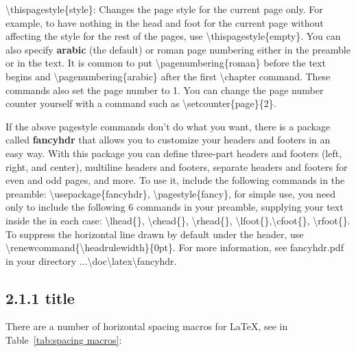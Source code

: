 \documentclass[12pt,openright]{book}
\begin{document}
\textbackslash thispagestyle\{style\}: Changes the page style for the current page only. For example, to have nothing in the head and foot for the current page without affecting the style for the rest of the pages, use \textbackslash thispagestyle\{empty\}. You can also specify \textbf{arabic} (the default) or roman page numbering either in the preamble or in the text. It is common to put \textbackslash pagenumbering\{roman\} before the text begins and \textbackslash pagenumbering\{arabic\} after the first \textbackslash chapter command. These commands also set the page number to 1. You can change the page number counter yourself with a command such as \textbackslash setcounter\{page\}\{2\}.

If the above pagestyle commands don’t do what you want, there is a package called \textbf{fancyhdr} that allows you to customize your headers and footers in an easy way. With this package you can define three-part headers and footers (left, right, and center), multiline headers and footers, separate headers and footers for even and odd pages, and more. To use it, include the following commands in the preamble: \textbackslash usepackage\{fancyhdr\}, \textbackslash pagestyle\{fancy\}, for simple use, you need only to include the following 6 commands in your preamble, supplying your text inside the {} in each case: \textbackslash lhead\{\}, \textbackslash chead\{\}, \textbackslash rhead\{\}, \textbackslash lfoot\{\},\textbackslash cfoot\{\}, \textbackslash rfoot\{\}. To suppress the horizontal line drawn by default under the header, use \textbackslash renewcommand\{\textbackslash headrulewidth\}\{0pt\}. For more information, see fancyhdr.pdf in your directory ...\textbackslash doc\textbackslash latex\textbackslash fancyhdr.

\subsection{2.1.1 title}

\noindent There are a number of horizontal spacing macros for \LaTeX, see in Table~\ref{tab:spacing macros}:
\end{document}
